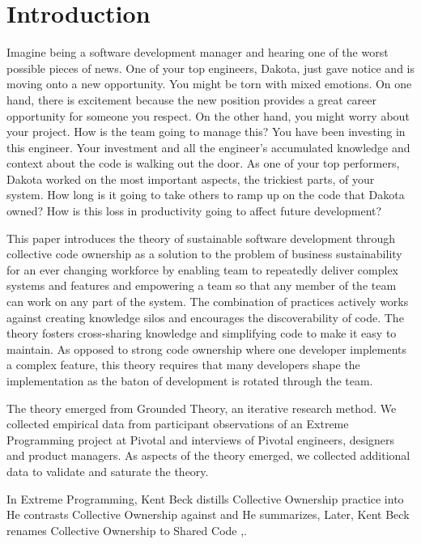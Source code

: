 \section{Introduction}

Imagine being a software development manager and hearing one of the worst possible pieces of news.  One of your top engineers, Dakota, just gave notice and is moving onto a new opportunity. You might be torn with mixed emotions. On one hand, there is excitement because the new position provides a great career opportunity for someone you respect. On the other hand, you might worry about your project. How is the team going to manage this? You have been investing in this engineer. Your investment and all the engineer's accumulated knowledge and context about the code is walking out the door.  As one of your top performers, Dakota worked on the most important aspects, the trickiest parts, of your system. How long is it going to take others to ramp up on the code that Dakota owned? How is this loss in productivity going to affect future development? 

This paper introduces the theory of sustainable software development through collective code ownership as a solution to the problem of business sustainability for an ever changing workforce by enabling team to repeatedly deliver complex systems and features and empowering a team so that any member of the team can work on any part of the system. The combination of practices actively works against creating knowledge silos and encourages the discoverability of code. The theory fosters cross-sharing knowledge and simplifying code to make it easy to maintain. As opposed to strong code ownership where one developer implements a complex feature, this theory requires that many developers shape the implementation as the baton of development is rotated through the team.

The theory emerged from Grounded Theory, an iterative research method. We collected empirical data from participant observations of an Extreme Programming project at Pivotal and interviews of Pivotal engineers, designers and product managers. As aspects of the theory emerged, we collected additional data to validate and saturate the theory.

In Extreme Programming, Kent Beck distills Collective Ownership practice into  He contrasts Collective Ownership against  and  He summarizes,   \cite{ExtremeProgramming2000} Later, Kent Beck renames Collective Ownership to Shared Code \cite{ExtremeProgramming2004},. 

